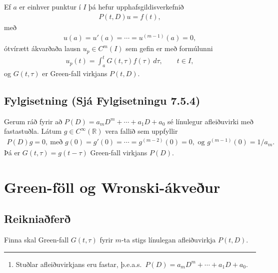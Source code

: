 \documentclass[a4paper,10pt,icelandic]{sphinxmanual}
\begin{document}
Ef \(a\) er einhver punktur í \(I\) þá hefur upphafsgildisverkefnið
\begin{equation*}
\begin{split}P(t,D)u=f(t),\end{split}
\end{equation*}
með
\begin{equation*}
\begin{split}u(a)=u'(a)=\cdots=u^{(m-1)}(a)=0,\end{split}
\end{equation*}
ótvírætt ákvarðaða lausn \(u_p\in C^m(I)\) sem gefin er með formúlunni
\begin{equation*}
\begin{split}u_p(t) = \int_a^t G(t,\tau)f(\tau) \, d\tau, \qquad t\in I,\end{split}
\end{equation*}
og \(G(t,\tau)\) er Green-fall virkjans \(P(t, D)\).


\subsection{Fylgisetning (Sjá Fylgisetningu 7.5.4)}
\label{\detokenize{Kafli07:fylgisetning-sja-fylgisetningu-7-5-4}}
Gerum ráð fyrir að \(P(D)=a_mD^m+\cdots+a_1D+a_0\) sé línulegur afleiðuvirki með fastastuðla. Látum \(g\in C^{\infty}(\mathbb{R})\) vera fallið sem uppfyllir
\begin{equation*}
\begin{split}P(D)g=0,\  \text{með }
g(0)=g'(0)=\cdots=g^{(m-2)}(0)=0,\mbox{ og }
g^{(m-1)}(0)=1/a_m.\end{split}
\end{equation*}
Þá er \(G(t,\tau)=g(t-\tau)\) Green-fall virkjans \(P(D)\).


\section{Green-föll og Wronski-ákveður}
\label{\detokenize{Kafli07:green-foll-og-wronski-akveur}}

\subsection{Reikniaðferð}
\label{\detokenize{Kafli07:reikniafer}}
Finna skal Green-fall \(G(t,\tau)\) fyrir \(m\)-ta stigs línulegan afleiðuvirkja \(P(t,D)\).


\bigskip\hrule\bigskip

\begin{enumerate}
%
\item {} 
Stuðlar afleiðuvirkjans eru fastar, þ.e.a.s. \(P(D)=a_mD^m+\cdots+a_1D+a_0\).

\end{enumerate}
\end{document}
